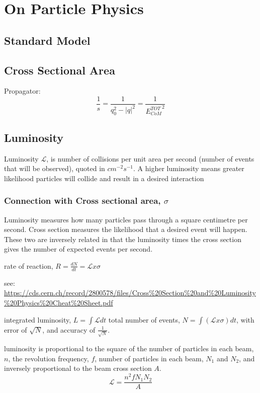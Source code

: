 \documentclass[11pt,a4paper]{article}
\begin{document}

\section{On Particle Physics}
\subsection{Standard Model}
\subsection{Cross Sectional Area}
Propagator:
\begin{equation}
    \frac{1}{s} = \frac{1}{q_0^2 - |q|^2} = \frac{1}{{E^{TOT}_{CoM}}^2}
\end{equation}

\subsection{Luminosity}
Luminosity $\mathscr{L}$, is number of collisions per unit area per second (number of events that will be observed), quoted in $cm^{-2}s^{-1}$. A higher luminosity means greater likelihood particles will collide and result in a desired interaction

\subsubsection{Connection with Cross sectional area, $\sigma$}
Luminosity measures how many particles pass through a square centimetre per second. Cross section measures
the likelihood that a desired event will happen. These two are inversely related in that the luminosity times the
cross section gives the number of expected events per second.

rate of reaction, $R = \frac{dN}{dt} = \mathscr{L} x \sigma$

see: \url{https://cds.cern.ch/record/2800578/files/Cross%20Section%20and%20Luminosity%20Physics%20Cheat%20Sheet.pdf}

integrated luminosity, $L = \int \mathscr{L} dt$
total number of events, $N = \int (\mathscr{L} x \sigma) dt$, with error of $\sqrt{N}$, and accuracy of $\frac{1}{\sqrt{N}}$.

luminosity is proportional to the square of the number of particles in each beam, $n$, the revolution frequency, $f$, number of particles in each beam, $N_1$ and $N_2$, and inversely proportional to the beam cross section $A$.
\begin{equation}
    \mathscr{L} = \frac{n^2 f N_1 N_2}{A}
\end{equation}
\end{document}
